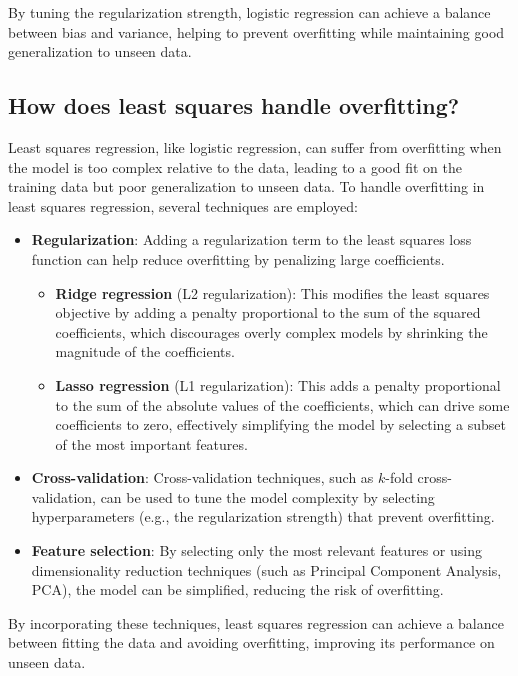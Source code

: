 By tuning the regularization strength, logistic regression can achieve a balance between bias and variance, helping to prevent overfitting while maintaining good generalization to unseen data.


\subsection{How does least squares handle overfitting?}

Least squares regression, like logistic regression, can suffer from overfitting when the model is too complex relative to the data, leading to a good fit on the training data but poor generalization to unseen data. To handle overfitting in least squares regression, several techniques are employed:

\begin{itemize}
    \item \textbf{Regularization}: Adding a regularization term to the least squares loss function can help reduce overfitting by penalizing large coefficients.
    \begin{itemize}
        \item \textbf{Ridge regression} (L2 regularization): This modifies the least squares objective by adding a penalty proportional to the sum of the squared coefficients, which discourages overly complex models by shrinking the magnitude of the coefficients.
        \item \textbf{Lasso regression} (L1 regularization): This adds a penalty proportional to the sum of the absolute values of the coefficients, which can drive some coefficients to zero, effectively simplifying the model by selecting a subset of the most important features.
    \end{itemize}
    \item \textbf{Cross-validation}: Cross-validation techniques, such as $k$-fold cross-validation, can be used to tune the model complexity by selecting hyperparameters (e.g., the regularization strength) that prevent overfitting.
    \item \textbf{Feature selection}: By selecting only the most relevant features or using dimensionality reduction techniques (such as Principal Component Analysis, PCA), the model can be simplified, reducing the risk of overfitting.
\end{itemize}

By incorporating these techniques, least squares regression can achieve a balance between fitting the data and avoiding overfitting, improving its performance on unseen data.


